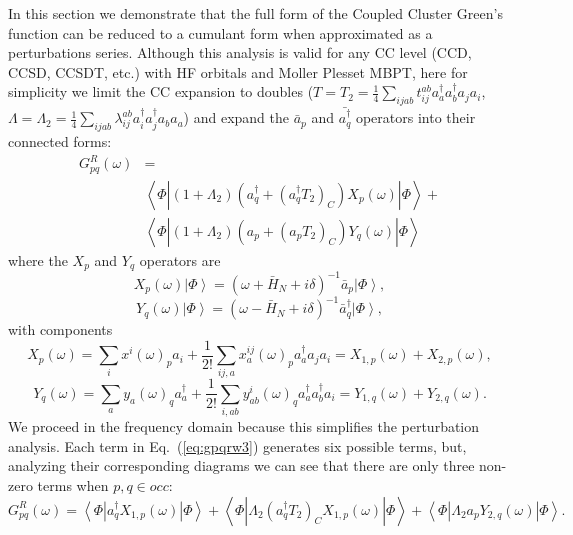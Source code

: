 \documentclass[aps,prb,preprint,groupaddress,floatfix]{revtex4}
\begin{document}
In this section we demonstrate that the full form of the Coupled Cluster Green's function can be reduced to a cumulant form when approximated as a perturbations series. Although this analysis is valid for any CC level (CCD, CCSD, CCSDT, etc.) with HF orbitals and Moller Plesset MBPT, here for simplicity we limit the CC expansion to doubles ($T=T_2=\frac{1}{4}\sum_{ijab}t_{ij}^{ab} a^{\dagger}_a a^{\dagger}_b a_j a_i$, $\Lambda=\Lambda_2=\frac{1}{4}\sum_{ijab}\lambda_{ij}^{ab} a^{\dagger}_i a^{\dagger}_j a_b a_a$) and expand the $\bar{a}_p$ and $\bar{a^{\dagger}_q}$ operators into their connected forms:
\begin{equation}
\label{eq:gpqrw3}
\begin{split}
G^R_{pq} (\omega) &=\\
&\left< \Phi \left| (1+\Lambda_2)
(a^{\dagger}_q + (a^{\dagger}_q T_2)_C)
X_{p}(\omega) \right| \Phi \right> +\\
&\left< \Phi \left| (1+\Lambda_2)
(a_p + (a_p T_2)_C)
Y_{q}(\omega) \right| \Phi \right>
\end{split}
\end{equation}
where the $X_p$ and $Y_q$ operators are
\begin{equation}
X_{p}(\omega) \left| \Phi \right> = (\omega+\bar{H}_N+i\delta)^{-1}
\bar{a}_p \left| \Phi \right>,
\end{equation}
\begin{equation}
Y_{q}(\omega) \left| \Phi \right> = (\omega-\bar{H}_N+i\delta)^{-1}
\bar{a}^{\dagger}_q \left| \Phi \right>,
\end{equation}
with components
\begin{equation}
X_{p}(\omega) = \sum_i x^i(\omega)_p a_i +
\frac{1}{2!}\sum_{ij,a} x^{ij}_a(\omega)_p a^{\dagger}_a a_j a_i = X_{1,p}(\omega)+X_{2,p}(\omega),
\end{equation}
\begin{equation}
Y_{q}(\omega) = \sum_a y_a(\omega)_q a^{\dagger}_a +
\frac{1}{2!}\sum_{i,ab} y^i_{ab}(\omega)_q a^{\dagger}_a a^{\dagger}_b a_i = Y_{1,q}(\omega)+Y_{2,q}(\omega).
\end{equation}
We proceed in the frequency domain because this simplifies the perturbation analysis. Each term in Eq.\ (\ref{eq:gpqrw3}) generates six possible terms, but, analyzing their corresponding diagrams we can see that there are only three non-zero terms when $p,q \in occ$:
\begin{equation}
\label{eq:gpqrw4}
G^R_{pq} (\omega) =
\left< \Phi \left| a^{\dagger}_q X_{1,p}(\omega) \right| \Phi \right> +
\left< \Phi \left| \Lambda_2 (a^{\dagger}_q T_2)_C
X_{1,p}(\omega) \right| \Phi \right> +
\left< \Phi \left| \Lambda_2 a_p Y_{2,q}(\omega) \right| \Phi \right>.
\end{equation}
\end{document}

